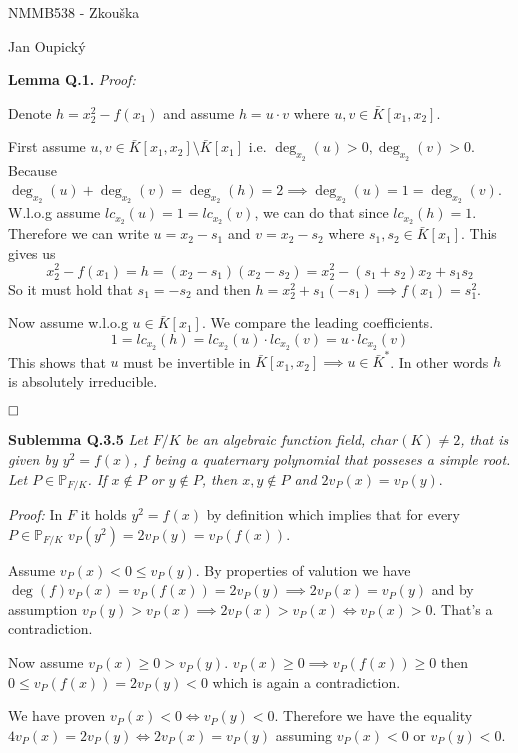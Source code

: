 \documentclass[12pt, a4paper]{article}
\newcommand{\qed}{\hfill\square}
\begin{document}
\begin{center}
\large NMMB538 - Zkouška

\normalsize Jan Oupický
\end{center}
\vspace{1\baselineskip}

\textbf{Lemma Q.1.} \textit{Proof:}

Denote $h = x_2^2 - f(x_1)$ and assume $h = u \cdot v$ where $u, v \in \bar{K}[x_1,x_2]$. 

First assume $u,v \in \bar{K}[x_1,x_2] \setminus \bar{K}[x_1]$ i.e. $\deg_{x_2}(u) > 0, \deg_{x_2}(v) > 0$. Because $\deg_{x_2}(u) + \deg_{x_2}(v) = \deg_{x_2}(h) = 2 \implies \deg_{x_2}(u) = 1 = \deg_{x_2}(v)$. W.l.o.g assume $lc_{x_2}(u)=1=lc_{x_2}(v)$, we can do that since $lc_{x_2}(h)=1$. Therefore we can write $u = x_2 - s_1$ and $v = x_2 - s_2$ where $s_1, s_2 \in \bar{K}[x_1]$. This gives us
\[
x_2^2 - f(x_1) =h = (x_2 - s_1)(x_2 - s_2) = x_2^2 - (s_1+s_2)x_2 + s_1 s_2
\]
So it must hold that $s_1 = -s_2$ and then $h = x_2^2 + s_1(-s_1) \implies f(x_1) = s_1^2$. 

Now assume w.l.o.g $u \in \bar{K}[x_1]$. We compare the leading coefficients.
\[
1 = lc_{x_2}(h) = lc_{x_2}(u) \cdot lc_{x_2}(v) = u \cdot lc_{x_2}(v)
\]
This shows that $u$ must be invertible in $\bar{K}[x_1,x_2] \implies u \in \bar{K}^*$. In other words $h$ is absolutely irreducible. 

$\qed$

\textbf{Sublemma Q.3.5} \textit{Let $F/K$ be an algebraic function field, $char(K) \neq 2$, that is given by $y^2 = f(x)$, $f$ being a quaternary polynomial that posseses a simple root. Let $P \in \mathbb{P}_{F/K}$. If $x \notin P$ or $y \notin P$, then $x,y \notin P$ and $2v_P(x)=v_P(y)$}.

\textit{Proof:}
In $F$ it holds $y^2 = f(x)$ by definition which implies that for every $P \in \mathbb{P}_{F/K}$ $v_P(y^2) = 2v_P(y)=v_P(f(x))$.

Assume $v_P(x) < 0 \leq v_P(y)$. By properties of valution we have $\deg(f)v_P(x) = v_P(f(x)) = 2v_P(y) \implies 2v_P(x)=v_P(y)$ and by assumption $v_P(y) > v_P(x) \implies 2v_P(x) > v_P(x) \iff v_P(x) > 0$. That's a contradiction.

Now assume $v_P(x) \geq 0 > v_P(y)$. $v_P(x) \geq 0 \implies v_P(f(x)) \geq 0$ then $0 \leq v_P(f(x)) = 2v_P(y) < 0$ which is again a contradiction.

We have proven $v_P(x) < 0 \iff v_P(y) < 0$. Therefore we have the equality $4v_P(x) = 2v_P(y) \iff 2v_P(x) = v_P(y)$ assuming $v_P(x) < 0$ or $v_P(y) < 0$. 
\end{document}
